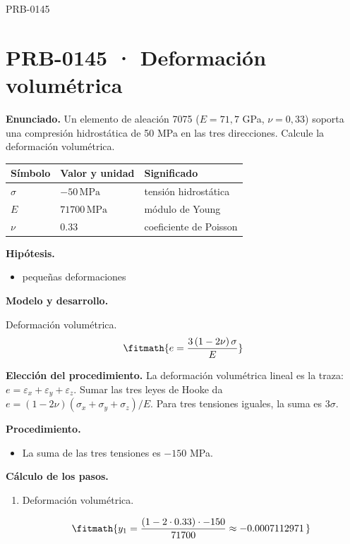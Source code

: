 \begin{studiumworked}{PRB-0145}

\section{PRB-0145 · Deformación volumétrica}

\textbf{Enunciado.} Un elemento de aleación 7075 ($E = 71{,}7$ GPa, $\nu = 0{,}33$) soporta una compresión hidrostática de 50 MPa en las tres direcciones. Calcule la deformación volumétrica.

\par\medskip\noindent\begin{tabular}{@{}p{.18\linewidth}p{.26\linewidth}p{.48\linewidth}@{}}
\toprule Símbolo & Valor y unidad & Significado\\\midrule
$\sigma$ & $-50\,\mathrm{MPa}$ & tensión hidrostática\\
$E$ & $71700\,\mathrm{MPa}$ & módulo de Young\\
$\nu$ & $0.33$ & coeficiente de Poisson\\
\bottomrule\end{tabular}\par\medskip

\textbf{Hipótesis.}\begin{itemize}\item pequeñas deformaciones\end{itemize}

\textbf{Modelo y desarrollo.}

Deformación volumétrica.\[\fitmath{e = \frac{3\,(1 - 2\nu)\,\sigma}{E}}\]

\textbf{Elección del procedimiento.} La deformación volumétrica lineal es la traza: $e=\varepsilon_x+\varepsilon_y+\varepsilon_z$. Sumar las tres leyes de Hooke da $e=(1-2\nu)(\sigma_x+\sigma_y+\sigma_z)/E$. Para tres tensiones iguales, la suma es $3\sigma$.

\textbf{Procedimiento.}\begin{itemize}\item La suma de las tres tensiones es $-150$ MPa.\end{itemize}

\textbf{Cálculo de los pasos.}

\begin{enumerate}

\item Deformación volumétrica.

\[\fitmath{y_{1}=\frac{\left(1-2\cdot 0.33\right)\cdot -150}{71700}\approx -0.0007112971\,}\]


\end{enumerate}
\end{studiumworked}
